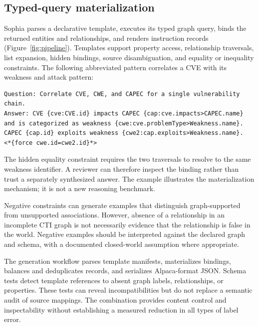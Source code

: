 \documentclass[preprint,12pt,authoryear]{elsarticle}
\begin{document}
\subsection{Typed-query materialization}
Sophia parses a declarative template, executes its typed graph query, binds the returned entities and relationships, and renders instruction records (Figure~\ref{fig:pipeline}). Templates support property access, relationship traversals, list expansion, hidden bindings, source disambiguation, and equality or inequality constraints. The following abbreviated pattern correlates a CVE with its weakness and attack pattern:
\begin{lstlisting}
Question: Correlate CVE, CWE, and CAPEC for a single vulnerability chain.
Answer: CVE {cve:CVE.id} impacts CAPEC {cap:cve.impacts>CAPEC.name}
and is categorized as weakness {cwe:cve.problemType>Weakness.name}.
CAPEC {cap.id} exploits weakness {cwe2:cap.exploits>Weakness.name}.
<*{force cwe.id=cwe2.id}*>
\end{lstlisting}
The hidden equality constraint requires the two traversals to resolve to the same weakness identifier. A reviewer can therefore inspect the binding rather than trust a separately synthesized answer. The example illustrates the materialization mechanism; it is not a new reasoning benchmark.

Negative constraints can generate examples that distinguish graph-supported from unsupported associations. However, absence of a relationship in an incomplete CTI graph is not necessarily evidence that the relationship is false in the world. Negative examples should be interpreted against the declared graph and schema, with a documented closed-world assumption where appropriate.

The generation workflow parses template manifests, materializes bindings, balances and deduplicates records, and serializes Alpaca-format JSON. Schema tests detect template references to absent graph labels, relationships, or properties. These tests can reveal incompatibilities but do not replace a semantic audit of source mappings. The combination provides content control and inspectability without establishing a measured reduction in all types of label error.
\end{document}
